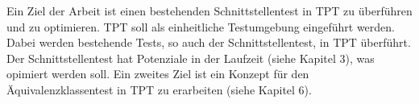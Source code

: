 Ein Ziel der Arbeit ist einen bestehenden Schnittstellentest in TPT zu überführen und zu optimieren.
TPT soll als einheitliche Testumgebung eingeführt werden. Dabei werden bestehende Tests, so auch der Schnittstellentest,
in TPT überführt. Der Schnittstellentest hat Potenziale in der Laufzeit (siehe Kapitel 3), was opimiert werden soll.
Ein zweites Ziel ist ein Konzept für den Äquivalenzklassentest in TPT zu erarbeiten (siehe Kapitel 6). 




